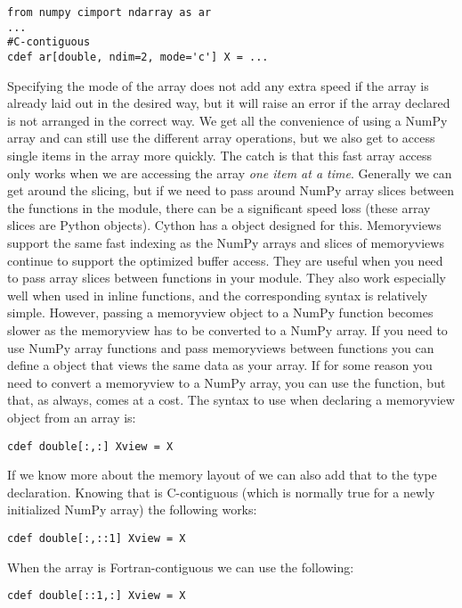 \begin{lstlisting}
from numpy cimport ndarray as ar
...
#C-contiguous
cdef ar[double, ndim=2, mode='c'] X = ...
\end{lstlisting}
Specifying the mode of the array does not add any extra speed if the array is already laid out in the desired way, but it will raise an error if the array declared is not arranged in the correct way.
We get all the convenience of using a NumPy array and can still use the different array operations, but we also get to access single items in the array more quickly.
The catch is that this fast array access only works when we are accessing the array \textit{one item at a time}.
Generally we can get around the slicing, but if we need to pass around NumPy array slices between the functions in the module, there can be a significant speed loss (these array slices are Python objects).
Cython has a  object designed for this.
Memoryviews support the same fast indexing as the NumPy arrays and slices of memoryviews continue to support the optimized buffer access.
They are useful when you need to pass array slices between functions in your module.
They also work especially well when used in inline functions, and the corresponding syntax is relatively simple.
However, passing a memoryview object to a NumPy function becomes slower as the memoryview has to be converted to a NumPy array.
If you need to use NumPy array functions and pass memoryviews between functions you can define a  object that views the same data as your array.
If for some reason you need to convert a memoryview to a NumPy array, you can use the  function, but that, as always, comes at a cost.
The syntax to use when declaring a memoryview object from an array  is:
\begin{lstlisting}
cdef double[:,:] Xview = X
\end{lstlisting}
If we know more about the memory layout of  we can also add that to the type declaration.
Knowing that  is C-contiguous (which is normally true for a newly initialized NumPy array) the following works:
\begin{lstlisting}
cdef double[:,::1] Xview = X
\end{lstlisting}
When the array is Fortran-contiguous we can use the following:
\begin{lstlisting}
cdef double[::1,:] Xview = X
\end{lstlisting}

